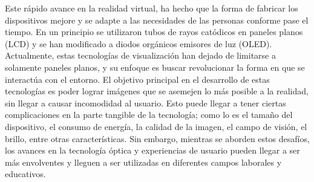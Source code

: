 Este rápido avance en la realidad virtual, ha hecho que la forma de fabricar los dispositivos mejore y se adapte a las necesidades de las personas conforme pase el tiempo. En un principio se utilizaron tubos de rayos catódicos en paneles planos (LCD) y se han modificado a diodos orgánicos emisores de luz (OLED). Actualmente, estas tecnologías de visualización han dejado de limitarse a solamente paneles planos, y su enfoque es buscar revolucionar la forma en que se interactúa con el entorno. El objetivo principal en el desarrollo de estas tecnologías es poder lograr imágenes que se asemejen lo más posible a la realidad, sin llegar a causar incomodidad al usuario. Esto puede llegar a tener ciertas complicaciones en la parte tangible de la tecnología; como lo es el tamaño del dispositivo, el consumo de energía, la calidad de la imagen, el campo de visión, el brillo, entre otras características. Sin embargo, mientras se aborden estos desafíos, los avances en la tecnología óptica y experiencias de usuario pueden llegar a ser más envolventes y lleguen a ser utilizadas en diferentes campos laborales y educativos. \parencite{zhan2020augmented}
